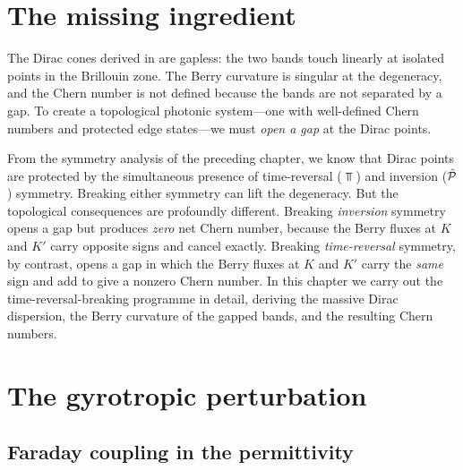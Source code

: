 
\section{The missing ingredient}
\label{sec:ch7-missing}

The Dirac cones derived in  are gapless: the two
bands touch linearly at isolated points in the Brillouin zone.  The
Berry curvature is singular at the degeneracy, and the Chern number is
not defined because the bands are not separated by a gap.  To create a
topological photonic system---one with well-defined Chern numbers and
protected edge states---we must \emph{open a gap} at the Dirac points.

From the symmetry analysis of the preceding chapter, we know that Dirac
points are protected by the simultaneous presence of time-reversal
($\Top$) and inversion ($\hat{\mathcal{P}}$) symmetry.  Breaking either symmetry can
lift the degeneracy.  But the topological consequences are profoundly
different.  Breaking \emph{inversion} symmetry opens a gap but
produces \emph{zero} net Chern number, because the Berry fluxes at
$K$ and $K'$ carry opposite signs and cancel exactly.  Breaking
\emph{time-reversal} symmetry, by contrast, opens a gap in which
the Berry fluxes at $K$ and $K'$ carry the \emph{same} sign and add
to give a nonzero Chern number.
In this chapter we carry out the time-reversal-breaking programme in
detail, deriving the massive Dirac dispersion, the Berry curvature of
the gapped bands, and the resulting Chern numbers.

\section{The gyrotropic perturbation}
\label{sec:ch7-gyrotropic}

\subsection{Faraday coupling in the permittivity}
\label{sec:ch7-faraday}

